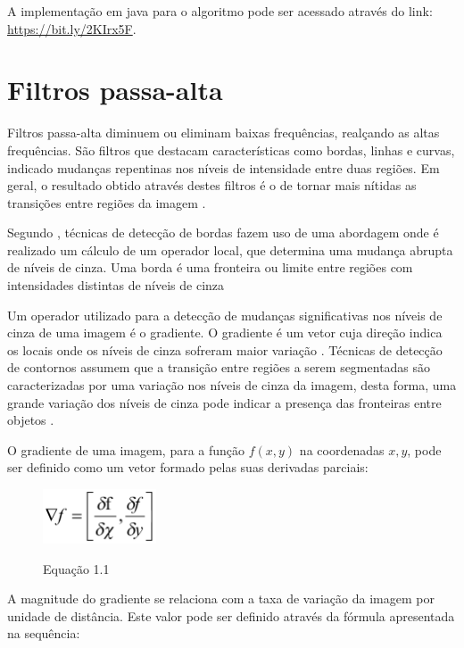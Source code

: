 \documentclass[
	12pt,				%
	oneside,			%
	a4paper,			%
	english,			%
	french,				%
	spanish,			%
	brazil,				%
	]{abntex2}
\begin{document}
A implementação em java para o algoritmo pode ser acessado através do link: \url{https://bit.ly/2KIrx5F}.

\section{Filtros passa-alta}
\label{sec:passaAlta}

Filtros passa-alta diminuem ou eliminam baixas frequências, realçando as altas frequências. São filtros que destacam características como bordas, linhas e curvas, indicado mudanças repentinas nos níveis de intensidade entre duas regiões. Em geral, o resultado obtido através destes filtros é o de tornar mais nítidas as transições entre regiões da imagem \cite{conciAzevedoLeta:2008}.

Segundo \citet{pedriniSchwartz:2008}, técnicas de detecção de bordas fazem uso de uma abordagem onde é realizado um cálculo de um operador local, que determina uma mudança abrupta de níveis de cinza. Uma borda é uma fronteira ou limite entre regiões com intensidades distintas de níveis de cinza

Um operador utilizado para a detecção de mudanças significativas nos níveis de cinza de uma imagem é o gradiente. O gradiente é um vetor cuja direção indica os locais onde os níveis de cinza sofreram maior variação \cite{pedriniSchwartz:2008}. Técnicas de detecção de contornos assumem que a transição entre regiões a serem segmentadas são caracterizadas por uma variação nos níveis de cinza da imagem, desta forma, uma grande variação dos níveis de cinza pode indicar a presença das fronteiras entre objetos \cite{conciAzevedoLeta:2008}. 

O gradiente de uma imagem, para a função \(f(x,y)\) na coordenadas \(x,y\), pode ser definido como um vetor formado pelas suas derivadas parciais:

\begin{figure}[ht]
\centering
\includegraphics[width=0.3\textwidth]{imagens/gradiente.png}

Equação 1.1
\end{figure}

A magnitude do gradiente se relaciona com a taxa de variação da imagem por unidade de distância. Este valor pode ser definido através da fórmula apresentada na sequência:
\end{document}
